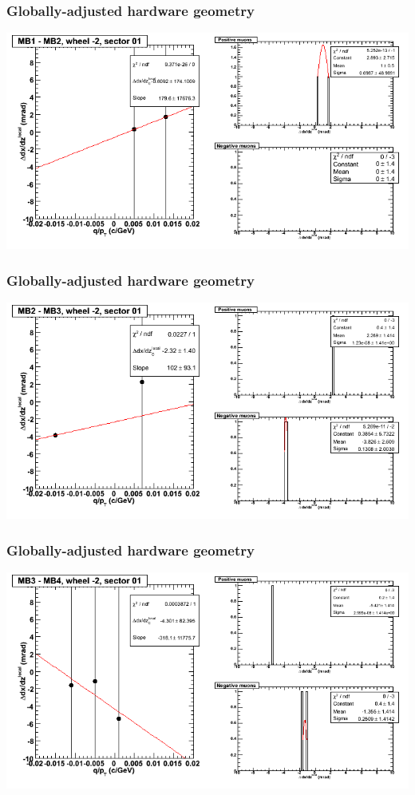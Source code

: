 \documentclass[compress]{beamer}
\begin{document}
\begin{frame}
\frametitle{Globally-adjusted hardware geometry}
\includegraphics[width=\linewidth]{NOV4_segdiffs_HW/dt13_slope_A_01_12.png}
\end{frame}

\begin{frame}
\frametitle{Globally-adjusted hardware geometry}
\includegraphics[width=\linewidth]{NOV4_segdiffs_HW/dt13_slope_A_01_23.png}
\end{frame}

\begin{frame}
\frametitle{Globally-adjusted hardware geometry}
\includegraphics[width=\linewidth]{NOV4_segdiffs_HW/dt13_slope_A_01_34.png}
\end{frame}
\end{document}
